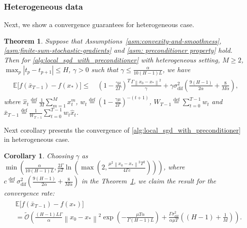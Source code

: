 \documentclass[sn-mathphys,Numbered]{sn-jnl}%
\newtheorem{theorem}{Theorem}
\newtheorem{corollary}{Corollary}
\newcommand*{\E}{{\mathbb E}}
\renewcommand{\|}{\parallel}
\newcommand\br[1]{\left ( #1 \right )}
\newcommand{\sqn}[1]{{\left\lVert#1\right\rVert}^2}
\newcommand{\abs}[1]{\left\lvert#1\right\rvert}
\newcommand{\eqdef}{\overset{\text{def}}{=}}
\newcommand{\avemm}{\frac{1}{M}\sum\limits_{m=1}^M}
\newcommand{\sigmaf}{\sigma_{\mathrm{dif}}}
\renewcommand {\*} {\ast}
\begin{document}
\subsubsection{Heterogeneous data}
Next, we show a convergence guarantees for heterogeneous case.
\begin{theorem}
    \label{thm:hetero_convergence_theorem}
    Suppose that Assumptions~\ref{asm:convexity-and-smoothness}, \ref{asm:finite-sum-stochastic-gradients} and \ref{asm: preconditioner property} hold. %
    Then for \cref{alg:local_sgd_with_preconditioner} with heterogeneous setting, $M \geq 2$, $\max_{p} \abs{t_p - t_{p+1}} \leq H$, $\gamma > 0$ such that $\gamma \leq \frac{\alpha}{10(H-1)L}$, we have
    \begin{align*}
        \begin{split}
            \E\big[f(\bar{x}_{T-1}) - f(x_\ast)\big] \leq&\ \br{1 - \frac{\gamma \mu}{2\Gamma}}^T\frac{\Gamma\sqn{x_{0} - x_\ast}}{\gamma} + \gamma\sigmaf^2\br{\frac{9 (H-1) }{2\alpha}  + \frac{8}{M\alpha}},
        \end{split}
    \end{align*}
    where $\hat{x}_t \eqdef \avemm x_t^m$, $w_t \eqdef \br{1 - \frac{\gamma\mu}{2\Gamma}}^{-(t+1)}$, $W_{T-1} \eqdef \sum\limits_{t=0}^{T-1} w_t$ and $\bar{x}_{T-1} \eqdef \frac{1}{W_{T-1}}\sum\limits_{t=0}^{T-1}w_t \hat{x}_t$. 
\end{theorem}
\noindent Next corollary presents the convergence of \cref{alg:local_sgd_with_preconditioner} in heterogeneous case. 
\begin{corollary}
    \label{corollary:wc-noniid-unbounded-var}
    Choosing $\gamma$ as $\min{\left(\frac{\alpha}{10(H-1)L}, \frac{2\Gamma}{\mu T}\ln{\br{\max{\br{2, \frac{\mu^2 \sqn{x_{0} - x_\ast} T^2}{4\Gamma c}}}}}\right)}$, where $c \eqdef \sigmaf^2\br{\frac{9 (H-1) }{2\alpha}  + \frac{8}{M\alpha}}$ in the Theorem~\ref{thm:hetero_convergence_theorem}, we claim the result for the convergence rate: 
    \begin{align*}
        \begin{split}
            &\E\big[f(\bar{x}_{T-1}) - f(x_\ast)\big] \\ &= \tilde{\mathcal{O}}\br{\frac{(H-1)L\Gamma}{\alpha} \sqn{x_0 - x_\ast} \exp{\br{-\frac{\mu T \alpha}{\Gamma(H-1)L}}} + \frac{\Gamma \sigmaf^2 }{\alpha \mu T} \br{(H-1)   + \frac{1}{M}}}.
        \end{split}
    \end{align*}
    
\end{corollary}
\end{document}
